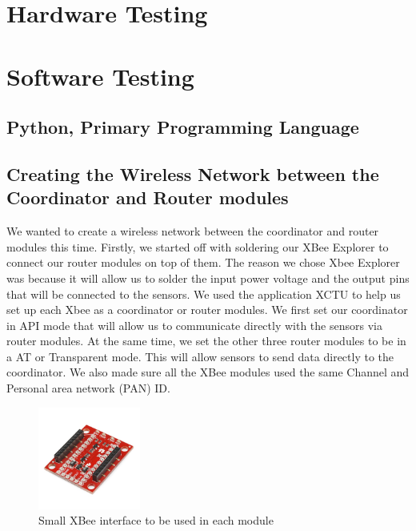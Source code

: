 \documentclass[letter,twocolumn]{report}
\begin{document}
	\section{Hardware Testing}
		

	

	\section{Software Testing}
	\subsection{Python, Primary Programming Language}
	
	\subsection{Creating the Wireless Network between the Coordinator and Router modules}
	\par We wanted to create a wireless network between the coordinator and router modules this time. Firstly, we started off with soldering our XBee Explorer to connect our router modules on top of them. The reason we chose Xbee Explorer was because it will allow us to solder the input power voltage and the output pins that will be connected to the sensors. We used the application XCTU to help us set up each Xbee as a coordinator or router modules. We first set our coordinator in API mode that will allow us to communicate directly with the sensors via router modules. At the same time, we set the other three router modules to be in a AT or Transparent mode. This will allow sensors to send data directly to the coordinator. We also made sure all the XBee modules used the same Channel and Personal area network (PAN) ID. 
	\begin{figure}[h]
		\centering
		\includegraphics[width = 0.3\textwidth]{xbeeMiniExplorer.png}
		\caption{Small XBee interface to be used in each module}
	\end{figure}
\end{document}
